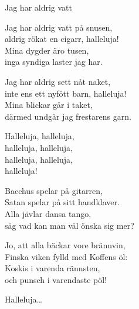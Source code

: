 \begin{song}{Jag har aldrig vatt}
	
	
	
	Jag har aldrig vatt på snusen,\\
	aldrig rökat en cigarr, halleluja!\\
	Mina dygder äro tusen,\\
	inga syndiga laster jag har.
	
	Jag har aldrig sett nåt naket,\\
	inte ens ett nyfött barn, halleluja!\\
	Mina blickar går i taket,\\
	därmed undgår jag frestarens garn.
	
	\begin{repetition}
	Halleluja, halleluja,\\
	halleluja, halleluja,\\
	halleluja, halleluja,\\
	halleluja!
	\end{repetition}
	
	Bacchus spelar på gitarren,\\
	Satan spelar på sitt handklaver.\\
	Alla jävlar dansa tango,\\
	säg vad kan man väl önska sig mer?
	
	Jo, att alla bäckar vore brännvin,\\
	Finska viken fylld med Koffens öl:\\
	Koskis i varenda rännsten,\\
	och punsch i varendaste pöl!
	
	Halleluja\ldots{}
	
\end{song}
